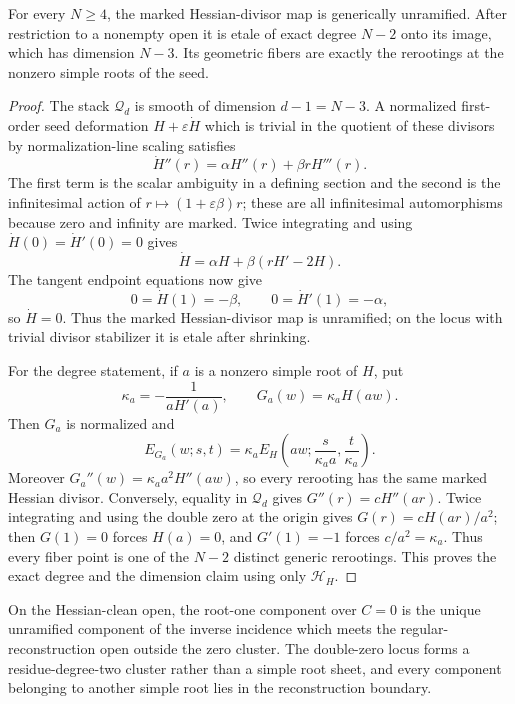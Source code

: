 \begin{proposition}
\label{prop:hessian-divisor-unramified}
For every $N\ge4$, the marked Hessian-divisor map is generically unramified.
After restriction to a nonempty open it is etale of exact degree $N-2$ onto
its image, which has dimension $N-3$.  Its geometric fibers are exactly the
rerootings at the nonzero simple roots of the seed.
\end{proposition}

\begin{proof}
The stack $\mathcal Q_d$ is smooth of dimension $d-1=N-3$.  A normalized
first-order seed deformation
$H+\varepsilon\dot H$ which is trivial in the quotient of these divisors
by normalization-line scaling satisfies
\[
 \dot H''(r)=\alpha H''(r)+\beta rH'''(r).             \tag{6.7}
\]
The first term is the scalar ambiguity in a defining section and the second
is the infinitesimal action of $r\mapsto(1+\varepsilon\beta)r$; these are all
infinitesimal automorphisms because zero and infinity are marked.  Twice
integrating and using
$\dot H(0)=\dot H'(0)=0$ gives
\[
 \dot H=\alpha H+\beta(rH'-2H).
\]
The tangent endpoint equations now give
\[
 0=\dot H(1)=-\beta,
 \qquad 0=\dot H'(1)=-\alpha,
\]
so $\dot H=0$.  Thus the marked Hessian-divisor map is unramified; on the
locus with trivial divisor stabilizer it is etale after shrinking.

For the degree statement, if $a$ is a nonzero simple root of $H$, put
\[
 \kappa_a=-\frac1{aH'(a)},\qquad G_a(w)=\kappa_aH(aw).
\]
Then $G_a$ is normalized and
\[
 E_{G_a}(w;s,t)=\kappa_a E_H\left(aw;
        \frac{s}{\kappa_a a},\frac{t}{\kappa_a}\right). \tag{6.8}
\]
Moreover $G_a''(w)=\kappa_a a^2H''(aw)$, so every rerooting has the same
marked Hessian divisor.  Conversely, equality in $\mathcal Q_d$ gives
$G''(r)=cH''(ar)$.  Twice integrating and using the double zero at the
origin gives $G(r)=cH(ar)/a^2$; then $G(1)=0$ forces $H(a)=0$, and
$G'(1)=-1$ forces $c/a^2=\kappa_a$.  Thus every fiber point is one of the
$N-2$ distinct generic rerootings.  This proves the exact degree and the
dimension claim using only $\mathcal H_H$.
\end{proof}

\begin{lemma}
\label{lem:affine-root-sheet}
On the Hessian-clean open, the root-one component over $C=0$ is
the unique unramified component of the inverse incidence which meets the
regular-reconstruction open outside the zero cluster.  The double-zero locus
forms a residue-degree-two cluster rather than a simple root sheet, and every
component belonging to another simple root lies in the reconstruction
boundary.
\end{lemma}

